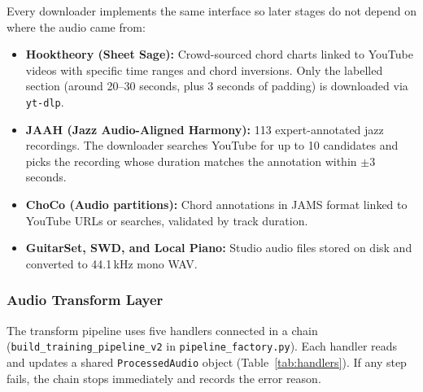 \documentclass[a4paper]{article}
\begin{document}
Every downloader implements the same interface so later stages do not depend on where the audio came from:

\begin{itemize}
    \item \textbf{Hooktheory (Sheet Sage):} Crowd-sourced chord charts linked to YouTube videos with specific time ranges and chord inversions. Only the labelled section (around 20--30 seconds, plus 3 seconds of padding) is downloaded via \texttt{yt-dlp}.
    \item \textbf{JAAH (Jazz Audio-Aligned Harmony):} 113 expert-annotated jazz recordings. The downloader searches YouTube for up to 10 candidates and picks the recording whose duration matches the annotation within $\pm 3$ seconds.
    \item \textbf{ChoCo (Audio partitions):} Chord annotations in JAMS format linked to YouTube URLs or searches, validated by track duration.
    \item \textbf{GuitarSet, SWD, and Local Piano:} Studio audio files stored on disk and converted to 44.1\,kHz mono WAV.
\end{itemize}

\subsubsection{Audio Transform Layer}

The transform pipeline uses five handlers connected in a chain (\texttt{build\_training\_pipeline\_v2} in \texttt{pipeline\_factory.py}). Each handler reads and updates a shared \texttt{ProcessedAudio} object (Table~\ref{tab:handlers}). If any step fails, the chain stops immediately and records the error reason.
\end{document}
